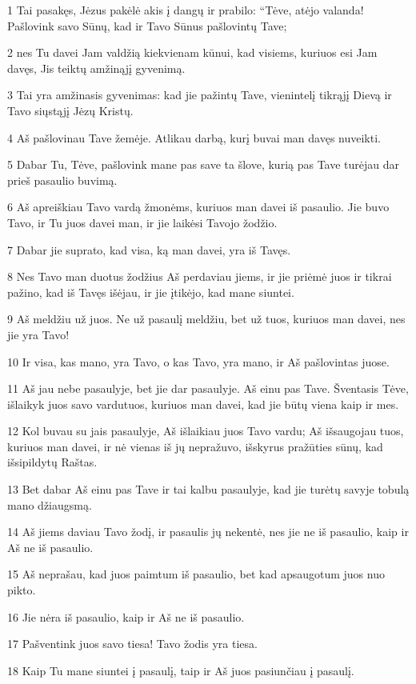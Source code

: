 \par 1 Tai pasakęs, Jėzus pakėlė akis į dangų ir prabilo: “Tėve, atėjo valanda! Pašlovink savo Sūnų, kad ir Tavo Sūnus pašlovintų Tave; 
\par 2 nes Tu davei Jam valdžią kiekvienam kūnui, kad visiems, kuriuos esi Jam davęs, Jis teiktų amžinąjį gyvenimą. 
\par 3 Tai yra amžinasis gyvenimas: kad jie pažintų Tave, vienintelį tikrąjį Dievą ir Tavo siųstąjį Jėzų Kristų. 
\par 4 Aš pašlovinau Tave žemėje. Atlikau darbą, kurį buvai man davęs nuveikti. 
\par 5 Dabar Tu, Tėve, pašlovink mane pas save ta šlove, kurią pas Tave turėjau dar prieš pasaulio buvimą. 
\par 6 Aš apreiškiau Tavo vardą žmonėms, kuriuos man davei iš pasaulio. Jie buvo Tavo, ir Tu juos davei man, ir jie laikėsi Tavojo žodžio. 
\par 7 Dabar jie suprato, kad visa, ką man davei, yra iš Tavęs. 
\par 8 Nes Tavo man duotus žodžius Aš perdaviau jiems, ir jie priėmė juos ir tikrai pažino, kad iš Tavęs išėjau, ir jie įtikėjo, kad mane siuntei. 
\par 9 Aš meldžiu už juos. Ne už pasaulį meldžiu, bet už tuos, kuriuos man davei, nes jie yra Tavo! 
\par 10 Ir visa, kas mano, yra Tavo, o kas Tavo, yra mano, ir Aš pašlovintas juose. 
\par 11 Aš jau nebe pasaulyje, bet jie dar pasaulyje. Aš einu pas Tave. Šventasis Tėve, išlaikyk juos savo vardu­tuos, kuriuos man davei, kad jie būtų viena kaip ir mes. 
\par 12 Kol buvau su jais pasaulyje, Aš išlaikiau juos Tavo vardu; Aš išsaugojau tuos, kuriuos man davei, ir nė vienas iš jų nepražuvo, išskyrus pražūties sūnų, kad išsipildytų Raštas. 
\par 13 Bet dabar Aš einu pas Tave ir tai kalbu pasaulyje, kad jie turėtų savyje tobulą mano džiaugsmą. 
\par 14 Aš jiems daviau Tavo žodį, ir pasaulis jų nekentė, nes jie ne iš pasaulio, kaip ir Aš ne iš pasaulio. 
\par 15 Aš neprašau, kad juos paimtum iš pasaulio, bet kad apsaugotum juos nuo pikto. 
\par 16 Jie nėra iš pasaulio, kaip ir Aš ne iš pasaulio. 
\par 17 Pašventink juos savo tiesa! Tavo žodis yra tiesa. 
\par 18 Kaip Tu mane siuntei į pasaulį, taip ir Aš juos pasiunčiau į pasaulį. 
